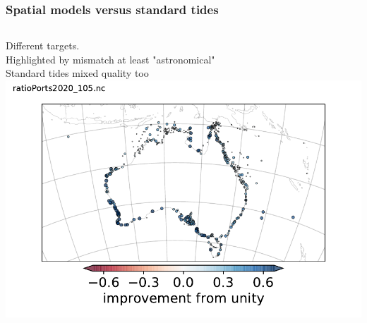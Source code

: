 \begin{frame}
\frametitle{Spatial models versus standard tides}
\begin{columns}
    \begin{column}{0.7\textwidth}      
    Different targets.\\
    Highlighted by mismatch at least "astronomical"\\
    Standard tides mixed quality too\\
    \hfill{}
    \includegraphics[width=\textwidth]{figures/maps/otpsPortCompare_Improve2020_105_diffRmse.pdf}
    \end{column}


\end{columns}
\end{frame}
